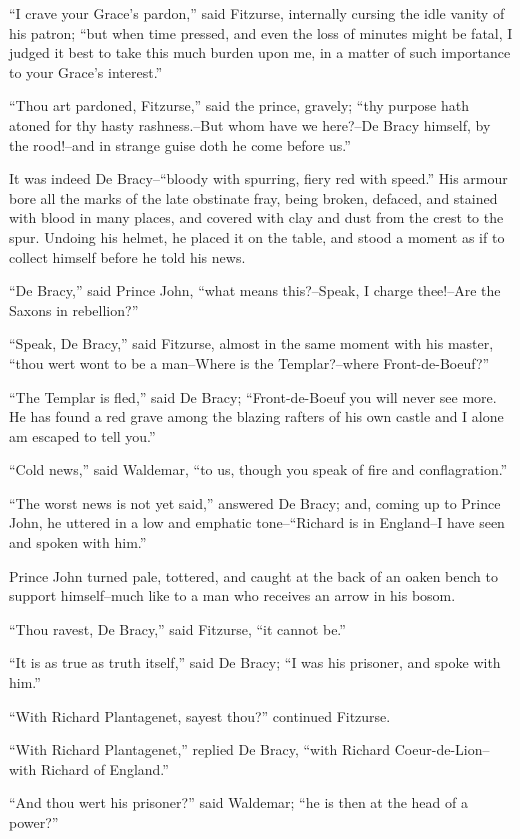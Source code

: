 ``I crave your Grace's pardon,'' said Fitzurse, internally cursing the
idle vanity of his patron; ``but when time pressed, and even the loss of
minutes might be fatal, I judged it best to take this much burden upon
me, in a matter of such importance to your Grace's interest.''

``Thou art pardoned, Fitzurse,'' said the prince, gravely; ``thy purpose
hath atoned for thy hasty rashness.--But whom have we here?--De Bracy
himself, by the rood!--and in strange guise doth he come before us.''

It was indeed De Bracy--``bloody with spurring, fiery red with speed.''
His armour bore all the marks of the late obstinate fray, being broken,
defaced, and stained with blood in many places, and covered with clay
and dust from the crest to the spur. Undoing his helmet, he placed it on
the table, and stood a moment as if to collect himself before he told
his news.

``De Bracy,'' said Prince John, ``what means this?--Speak, I charge
thee!--Are the Saxons in rebellion?''

``Speak, De Bracy,'' said Fitzurse, almost in the same moment with his
master, ``thou wert wont to be a man--Where is the Templar?--where
Front-de-Boeuf?''

``The Templar is fled,'' said De Bracy; ``Front-de-Boeuf you will never
see more. He has found a red grave among the blazing rafters of his own
castle and I alone am escaped to tell you.''

``Cold news,'' said Waldemar, ``to us, though you speak of fire and
conflagration.''

``The worst news is not yet said,'' answered De Bracy; and, coming up to
Prince John, he uttered in a low and emphatic tone--``Richard is in
England--I have seen and spoken with him.''

Prince John turned pale, tottered, and caught at the back of an oaken
bench to support himself--much like to a man who receives an arrow in
his bosom.

``Thou ravest, De Bracy,'' said Fitzurse, ``it cannot be.''

``It is as true as truth itself,'' said De Bracy; ``I was his prisoner,
and spoke with him.''

``With Richard Plantagenet, sayest thou?'' continued Fitzurse.

``With Richard Plantagenet,'' replied De Bracy, ``with Richard
Coeur-de-Lion--with Richard of England.''

``And thou wert his prisoner?'' said Waldemar; ``he is then at the head
of a power?''

